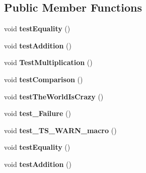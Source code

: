 \subsection*{Public Member Functions}
\begin{DoxyCompactItemize}
\item 
\hypertarget{classfoo_1_1bar_1_1Tests_acb9aa08a5063debc7f3a3c82eab2b93d}{void {\bfseries test\-Equality} ()}\label{classfoo_1_1bar_1_1Tests_acb9aa08a5063debc7f3a3c82eab2b93d}

\item 
\hypertarget{classfoo_1_1bar_1_1Tests_afbca7f6ae1391aaa15b9756491cbb75f}{void {\bfseries test\-Addition} ()}\label{classfoo_1_1bar_1_1Tests_afbca7f6ae1391aaa15b9756491cbb75f}

\item 
\hypertarget{classfoo_1_1bar_1_1Tests_a0b02e0f23457d6797bda982ab9c8bddf}{void {\bfseries Test\-Multiplication} ()}\label{classfoo_1_1bar_1_1Tests_a0b02e0f23457d6797bda982ab9c8bddf}

\item 
\hypertarget{classfoo_1_1bar_1_1Tests_a646b344360e1a10ea697cfe982ce3e1f}{void {\bfseries test\-Comparison} ()}\label{classfoo_1_1bar_1_1Tests_a646b344360e1a10ea697cfe982ce3e1f}

\item 
\hypertarget{classfoo_1_1bar_1_1Tests_a41fdb34c7d7ec5116eccf951e01dac66}{void {\bfseries test\-The\-World\-Is\-Crazy} ()}\label{classfoo_1_1bar_1_1Tests_a41fdb34c7d7ec5116eccf951e01dac66}

\item 
\hypertarget{classfoo_1_1bar_1_1Tests_a65c87f0f2273612455e59fd931cbb8bd}{void {\bfseries test\-\_\-\-Failure} ()}\label{classfoo_1_1bar_1_1Tests_a65c87f0f2273612455e59fd931cbb8bd}

\item 
\hypertarget{classfoo_1_1bar_1_1Tests_a0b2e0dc0667bc542f2a87b00f5722003}{void {\bfseries test\-\_\-\-T\-S\-\_\-\-W\-A\-R\-N\-\_\-macro} ()}\label{classfoo_1_1bar_1_1Tests_a0b2e0dc0667bc542f2a87b00f5722003}

\item 
\hypertarget{classfoo_1_1bar_1_1Tests_acb9aa08a5063debc7f3a3c82eab2b93d}{void {\bfseries test\-Equality} ()}\label{classfoo_1_1bar_1_1Tests_acb9aa08a5063debc7f3a3c82eab2b93d}

\item 
\hypertarget{classfoo_1_1bar_1_1Tests_afbca7f6ae1391aaa15b9756491cbb75f}{void {\bfseries test\-Addition} ()}\label{classfoo_1_1bar_1_1Tests_afbca7f6ae1391aaa15b9756491cbb75f}


\end{DoxyCompactItemize}
